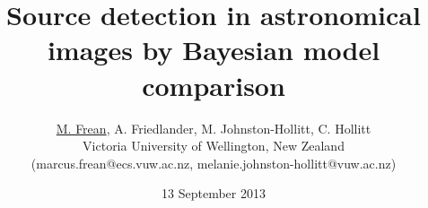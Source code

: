 \documentclass[letterpaper,12pt]{article}
\begin{document}
\title{Source detection in astronomical images by Bayesian model comparison}

\author{\underline{M. Frean}, A. Friedlander, M. Johnston-Hollitt, C. Hollitt\\
        Victoria University of Wellington, New Zealand\\
        (marcus.frean@ecs.vuw.ac.nz, melanie.johnston-hollitt@vuw.ac.nz)
       }

\date{13 September 2013}
\maketitle
\end{document}
